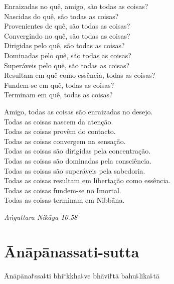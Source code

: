 \begin{english}
  Enraizadas no quê, amigo, são todas as coisas?\\
  Nascidas do quê, são todas as coisas?\\
  Provenientes de quê, são todas as coisas?\\
  Convergindo no quê, são todas as coisas?\\
  Dirigidas pelo quê, são todas as coisas?\\
  Dominadas pelo quê, são todas as coisas?\\
  Superáveis pelo quê, são todas as coisas?\\
  Resultam em quê como essência, todas as coisas?\\
  Fundem-se em quê, todas as coisas?\\
  Terminam em quê, todas as coisas?

  \bigskip

  Amigo, todas as coisas são enraizadas no desejo.\\
  Todas as coisas nascem da atenção.\\
  Todas as coisas provêm do contacto.\\
  Todas as coisas convergem na sensação.\\
  Todas as coisas são dirigidas pela concentração.\\
  Todas as coisas são dominadas pela consciência.\\
  Todas as coisas são superáveis pela sabedoria.\\
  Todas as coisas resultam em libertação como essência.\\
  Todas as coisas fundem-se no Imortal.\\
  Todas as coisas terminam em Nibbāna.

\end{english}

{\raggedleft
  \emph{Aṅguttara Nikāya 10.58}
\par}

\chapter{Ānāpānassati-sutta}


\begin{leader}
\end{leader}

Ānāpāna꜓ssa꜕ti bhi꜓kkha꜕ve bhāvi꜓tā bahu꜕līka꜕tā

